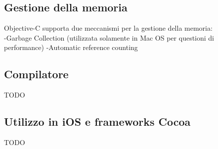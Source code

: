 \subsection{Gestione della memoria}
Objective-C supporta due meccanismi per la gestione della memoria:\\
-Garbage Collection (utilizzata solamente in Mac OS per questioni di performance) 
-Automatic reference counting
\subsection{Compilatore}
TODO
\subsection{Utilizzo in iOS e frameworks Cocoa}
TODO